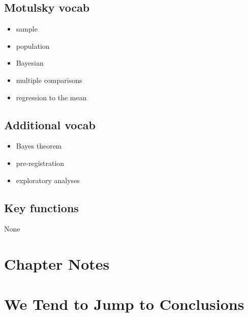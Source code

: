 \documentclass[]{book}
\providecommand{\tightlist}{%
  \setlength{\itemsep}{0pt}\setlength{\parskip}{0pt}}
\theoremstyle{definition}
\theoremstyle{definition}
\theoremstyle{definition}
\theoremstyle{remark}
\begin{document}
\subsection*{Motulsky vocab}\label{motulsky-vocab}

\begin{itemize}
\tightlist
\item
  sample
\item
  population
\item
  Bayesian
\item
  multiple comparisons
\item
  regression to the mean
\end{itemize}

\subsection*{Additional vocab}\label{additional-vocab}

\begin{itemize}
\tightlist
\item
  Bayes theorem
\item
  pre-registration
\item
  exploratory analyses
\end{itemize}

\subsection*{Key functions}\label{key-functions}

None

\section*{Chapter Notes}\label{chapter-notes}

\section{We Tend to Jump to
Conclusions}\label{we-tend-to-jump-to-conclusions}
\end{document}
